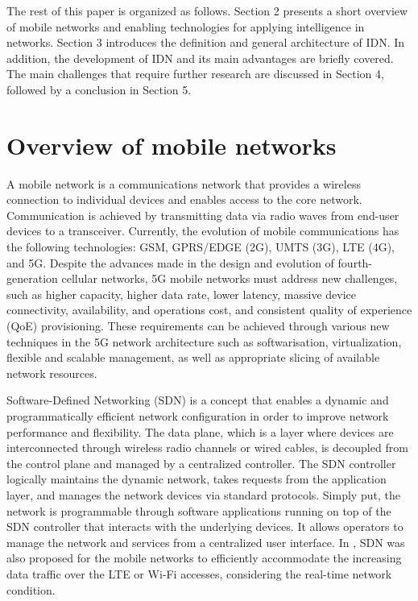 The rest of this paper is organized as follows. Section 2 presents a short overview of mobile networks and enabling technologies for applying intelligence in networks. Section 3 introduces the definition and general architecture of IDN. In addition, the development of IDN and its main advantages are briefly covered. The main challenges that require further research are discussed in Section 4, followed by a conclusion in Section 5.

\section{Overview of mobile networks}
\label{sec:Overview_of_mobile_networks}

A mobile network is a communications network that provides a wireless connection to individual devices and enables access to the core network. Communication is achieved by transmitting data via radio waves from end-user devices to a transceiver. Currently, the evolution of mobile communications has the following technologies: GSM, GPRS/EDGE (2G), UMTS (3G), LTE (4G), and 5G. Despite the advances made in the design and evolution of fourth-generation cellular networks, 5G mobile networks must address new challenges, such as higher capacity, higher data rate, lower latency, massive device connectivity, availability, and operations cost, and consistent quality of experience (QoE) provisioning. These requirements can be achieved through various new techniques in the 5G network architecture such as softwarisation, virtualization, flexible and scalable management, as well as appropriate slicing of available network resources.\cite{Demestichas2013}

Software-Defined Networking (SDN) is a concept that enables a dynamic and programmatically efficient network configuration in order to improve network performance and flexibility. The data plane, which is a layer where devices are interconnected through wireless radio channels or wired cables, is decoupled from the control plane and managed by a centralized controller\cite{Li2015}. The SDN controller logically maintains the dynamic network, takes requests from the application layer, and manages the network devices via standard protocols. Simply put, the network is programmable through software applications running on top of the SDN controller that interacts with the underlying devices. It allows operators to manage the network and services from a centralized user interface. In \cite{Amani2014}, SDN was also proposed for the mobile networks to efficiently accommodate the increasing data traffic over the LTE or Wi-Fi accesses, considering the real-time network condition.

